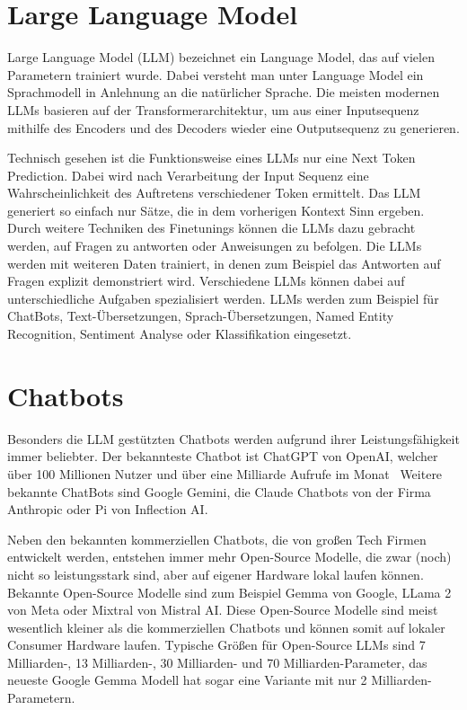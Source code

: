 \section{Large Language Model}

Large Language Model (LLM) bezeichnet ein Language Model, das auf vielen Parametern trainiert wurde. 
Dabei versteht man unter Language Model ein Sprachmodell in Anlehnung an die natürlicher Sprache.
Die meisten modernen LLMs basieren auf der Transformerarchitektur, um aus einer Inputsequenz mithilfe des Encoders und des Decoders wieder eine Outputsequenz zu generieren.


Technisch gesehen ist die Funktionsweise eines LLMs nur eine Next Token Prediction.
Dabei wird nach Verarbeitung der Input Sequenz eine Wahrscheinlichkeit des Auftretens verschiedener Token ermittelt.
Das LLM generiert so einfach nur Sätze, die in dem vorherigen Kontext Sinn ergeben.
Durch weitere Techniken des Finetunings können die LLMs dazu gebracht werden, auf Fragen zu antworten oder Anweisungen zu befolgen.
Die LLMs werden mit weiteren Daten trainiert, in denen zum Beispiel das Antworten auf Fragen explizit demonstriert wird.
Verschiedene LLMs können dabei auf unterschiedliche Aufgaben spezialisiert werden.
LLMs werden zum Beispiel für ChatBots, Text-Übersetzungen, Sprach-Übersetzungen, Named Entity Recognition, Sentiment Analyse oder Klassifikation eingesetzt.



\section{Chatbots}

Besonders die LLM gestützten Chatbots werden aufgrund ihrer Leistungsfähigkeit immer beliebter.
Der bekannteste Chatbot ist ChatGPT von OpenAI, welcher über 100 Millionen Nutzer und über eine Milliarde Aufrufe im Monat~\cite{tong2023}
Weitere bekannte ChatBots sind Google Gemini, die Claude Chatbots von der Firma Anthropic oder Pi von Inflection AI.

Neben den bekannten kommerziellen Chatbots, die von großen Tech Firmen entwickelt werden, entstehen immer mehr Open-Source Modelle, die zwar (noch) nicht so leistungsstark sind, aber auf eigener Hardware lokal laufen können.
Bekannte Open-Source Modelle sind zum Beispiel Gemma von Google, LLama 2 von Meta oder Mixtral von Mistral AI.
Diese Open-Source Modelle sind meist wesentlich kleiner als die kommerziellen Chatbots und können somit auf lokaler Consumer Hardware laufen.
Typische Größen für Open-Source LLMs sind 7 Milliarden-, 13 Milliarden-, 30 Milliarden- und 70 Milliarden-Parameter, das neueste Google Gemma Modell hat sogar eine Variante mit nur 2 Milliarden-Parametern.


